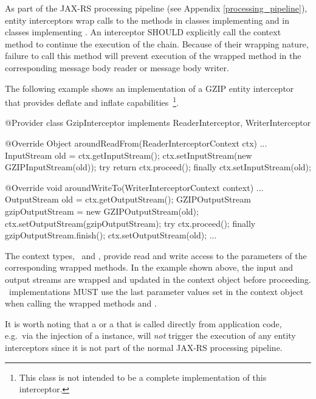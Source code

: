 As part of the JAX-RS processing pipeline (see Appendix \ref{processing_pipeline}), entity interceptors wrap calls to the methods  in classes implementing  and  in classes implementing . An interceptor SHOULD explicitly call the context method  to continue the execution of the chain. Because of their wrapping nature, failure to call this method will prevent execution of the wrapped method in the corresponding message body reader or message body writer.

The following example shows an implementation of a GZIP entity interceptor that provides deflate and inflate capabilities~\footnote{This class is not intended to be a complete implementation of this interceptor.}.

\begin{listing}{1}
@Provider
class GzipInterceptor implements ReaderInterceptor, WriterInterceptor {

    @Override
    Object aroundReadFrom(ReaderInterceptorContext ctx) ... {
        InputStream old = ctx.getInputStream();
        ctx.setInputStream(new GZIPInputStream(old));
        try {
            return ctx.proceed();
        } finally {
            ctx.setInputStream(old);
        }
    }

    @Override
    void aroundWriteTo(WriterInterceptorContext context) ... {
        OutputStream old = ctx.getOutputStream();
        GZIPOutputStream gzipOutputStream = new GZIPOutputStream(old);
        ctx.setOutputStream(gzipOutputStream);
        try {
            ctx.proceed();
        } finally {
            gzipOutputStream.finish();
            ctx.setOutputStream(old);
        }
    }
    ...
}
\end{listing}

The context types, \ReaderInterceptorContext\ and \WriterInterceptorContext, provide read and write access to the parameters of the corresponding wrapped methods. In the example shown above, the input and output streams are wrapped and updated in the context object before proceeding. \jaxrs\ implementations MUST use the last parameter values set in the context object when calling the wrapped methods  and .

It is worth noting that a  or a  that is called directly from application code, e.g.~via the injection of a  instance, will \emph{not} trigger the execution of any entity interceptors since it is not part of the normal JAX-RS processing pipeline. 


